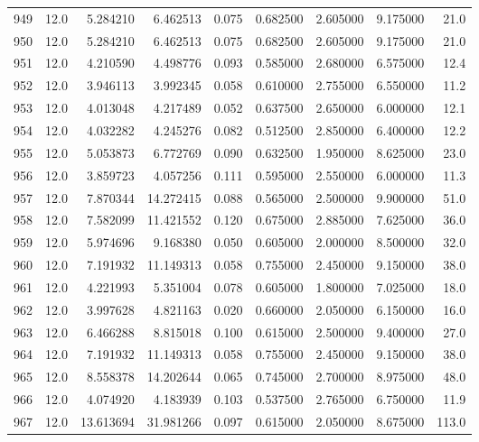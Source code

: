\begin{tabular}{lrrrrrrrr}
949  &   12.0 &   5.284210 &   6.462513 &  0.075 &  0.682500 &  2.605000 &   9.175000 &   21.0 \\
950  &   12.0 &   5.284210 &   6.462513 &  0.075 &  0.682500 &  2.605000 &   9.175000 &   21.0 \\
951  &   12.0 &   4.210590 &   4.498776 &  0.093 &  0.585000 &  2.680000 &   6.575000 &   12.4 \\
952  &   12.0 &   3.946113 &   3.992345 &  0.058 &  0.610000 &  2.755000 &   6.550000 &   11.2 \\
953  &   12.0 &   4.013048 &   4.217489 &  0.052 &  0.637500 &  2.650000 &   6.000000 &   12.1 \\
954  &   12.0 &   4.032282 &   4.245276 &  0.082 &  0.512500 &  2.850000 &   6.400000 &   12.2 \\
955  &   12.0 &   5.053873 &   6.772769 &  0.090 &  0.632500 &  1.950000 &   8.625000 &   23.0 \\
956  &   12.0 &   3.859723 &   4.057256 &  0.111 &  0.595000 &  2.550000 &   6.000000 &   11.3 \\
957  &   12.0 &   7.870344 &  14.272415 &  0.088 &  0.565000 &  2.500000 &   9.900000 &   51.0 \\
958  &   12.0 &   7.582099 &  11.421552 &  0.120 &  0.675000 &  2.885000 &   7.625000 &   36.0 \\
959  &   12.0 &   5.974696 &   9.168380 &  0.050 &  0.605000 &  2.000000 &   8.500000 &   32.0 \\
960  &   12.0 &   7.191932 &  11.149313 &  0.058 &  0.755000 &  2.450000 &   9.150000 &   38.0 \\
961  &   12.0 &   4.221993 &   5.351004 &  0.078 &  0.605000 &  1.800000 &   7.025000 &   18.0 \\
962  &   12.0 &   3.997628 &   4.821163 &  0.020 &  0.660000 &  2.050000 &   6.150000 &   16.0 \\
963  &   12.0 &   6.466288 &   8.815018 &  0.100 &  0.615000 &  2.500000 &   9.400000 &   27.0 \\
964  &   12.0 &   7.191932 &  11.149313 &  0.058 &  0.755000 &  2.450000 &   9.150000 &   38.0 \\
965  &   12.0 &   8.558378 &  14.202644 &  0.065 &  0.745000 &  2.700000 &   8.975000 &   48.0 \\
966  &   12.0 &   4.074920 &   4.183939 &  0.103 &  0.537500 &  2.765000 &   6.750000 &   11.9 \\
967  &   12.0 &  13.613694 &  31.981266 &  0.097 &  0.615000 &  2.050000 &   8.675000 &  113.0 \\

\end{tabular}
